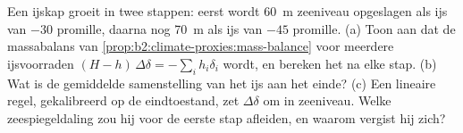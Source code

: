 \begin{exercise}[$\star\star\star$]\label{exo:b2:climate-proxies:12}
Een ijskap groeit in twee stappen: eerst wordt \qty{60}{m} zeeniveau opgeslagen als ijs van $-30$ promille,
daarna nog \qty{70}{m} als ijs van $-45$ promille. (a) Toon aan dat de massabalans van
\cref{prop:b2:climate-proxies:mass-balance} voor meerdere ijsvoorraden $(H - h)\,\Delta\delta = -\sum_i h_i\delta_i$
wordt, en bereken het  na elke stap. (b) Wat is de gemiddelde
samenstelling van het ijs aan het einde? (c) Een lineaire regel, gekalibreerd op de eindtoestand, zet
$\Delta\delta$ om in zeeniveau. Welke zeespiegeldaling zou hij voor de eerste stap afleiden, en waarom
vergist hij zich?
\end{exercise}

